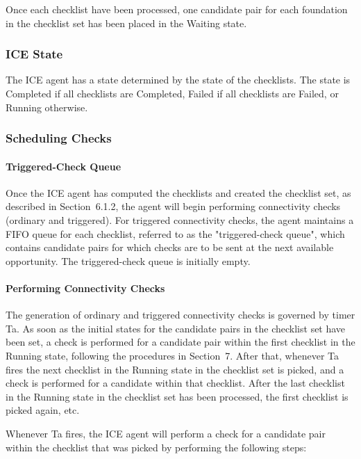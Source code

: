 \documentclass{article}
\begin{document}
Once each checklist have been processed, one candidate pair for each foundation in the checklist set has been placed in the Waiting state.

\subsubsection{ICE State}

The ICE agent has a state determined by the state of the checklists. The state is Completed if all checklists are Completed, Failed if all checklists are Failed, or Running otherwise.

\subsubsection{Scheduling Checks}

\paragraph{Triggered-Check Queue}

Once the ICE agent has computed the checklists and created the checklist set, as described in Section~6.1.2, the agent will begin performing connectivity checks (ordinary and triggered).  For triggered connectivity checks, the agent maintains a FIFO queue for each checklist, referred to as the "triggered-check queue", which contains candidate pairs for which checks are to be sent at the next available opportunity.  The triggered-check queue is initially empty.

\paragraph{Performing Connectivity Checks}

The generation of ordinary and triggered connectivity checks is governed by timer Ta.  As soon as the initial states for the candidate pairs in the checklist set have been set, a check is performed for a candidate pair within the first checklist in the Running state, following the procedures in Section~7.  After that, whenever Ta fires the next checklist in the Running state in the checklist set is picked, and a check is performed for a candidate within that checklist.  After the last checklist in the Running state in the checklist set has been processed, the first checklist is picked again, etc.

Whenever Ta fires, the ICE agent will perform a check for a candidate pair within the checklist that was picked by performing the following steps:
\end{document}
